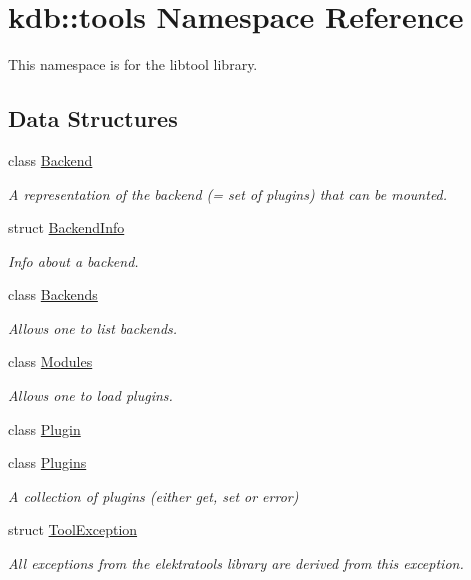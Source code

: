 \hypertarget{namespacekdb_1_1tools}{\section{kdb\-:\-:tools Namespace Reference}
\label{namespacekdb_1_1tools}
}


This namespace is for the libtool library.  


\subsection*{Data Structures}
\begin{DoxyCompactItemize}
\item 
class \hyperlink{classkdb_1_1tools_1_1Backend}{Backend}
\begin{DoxyCompactList}\small\item\em A representation of the backend (= set of plugins) that can be mounted. \end{DoxyCompactList}\item 
struct \hyperlink{structkdb_1_1tools_1_1BackendInfo}{Backend\-Info}
\begin{DoxyCompactList}\small\item\em Info about a backend. \end{DoxyCompactList}\item 
class \hyperlink{classkdb_1_1tools_1_1Backends}{Backends}
\begin{DoxyCompactList}\small\item\em Allows one to list backends. \end{DoxyCompactList}\item 
class \hyperlink{classkdb_1_1tools_1_1Modules}{Modules}
\begin{DoxyCompactList}\small\item\em Allows one to load plugins. \end{DoxyCompactList}\item 
class \hyperlink{classkdb_1_1tools_1_1Plugin}{Plugin}
\item 
class \hyperlink{classkdb_1_1tools_1_1Plugins}{Plugins}
\begin{DoxyCompactList}\small\item\em A collection of plugins (either get, set or error) \end{DoxyCompactList}\item 
struct \hyperlink{structkdb_1_1tools_1_1ToolException}{Tool\-Exception}
\begin{DoxyCompactList}\small\item\em All exceptions from the elektratools library are derived from this exception. \end{DoxyCompactList}\end{DoxyCompactItemize}
